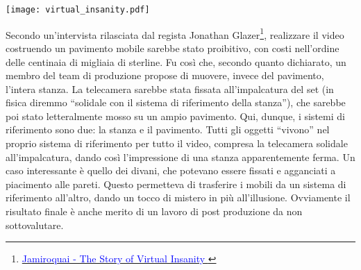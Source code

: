 \begin{marginfigure}
    \centering
    \texttt{[image: virtual\_insanity.pdf]}
    \caption{Schema semplificato del set realizzato per il video musicale:
    (1) telecamera fissata alla stanza mobile, (2) Jay Kay che si diverte,
    (3) stanza mobile, (4) pavimento del set.}
\end{marginfigure}


Secondo un'intervista rilasciata dal regista Jonathan Glazer\footnote{\href{https://www.youtube.com/watch?v=nY6YwZzKzTI}{\textcolor{blue}{Jamiroquai - The Story of Virtual Insanity
}}}, realizzare il video costruendo un pavimento mobile sarebbe
stato proibitivo, con costi nell'ordine delle centinaia di migliaia
di sterline. Fu così che, secondo quanto dichiarato, un membro del team di produzione
propose di muovere, invece del pavimento, l'intera stanza.
La telecamera sarebbe stata fissata all'impalcatura del set
(in fisica diremmo ``solidale con il sistema di riferimento
della stanza''), che sarebbe poi stato letteralmente mosso
su un ampio pavimento.
Qui, dunque, i sistemi di riferimento sono due: la stanza e il
pavimento. Tutti gli oggetti ``vivono'' nel proprio sistema
di riferimento per tutto il video, compresa la telecamera solidale
all'impalcatura, dando così l'impressione di
una stanza apparentemente ferma. Un caso interessante è
quello dei divani, che potevano essere fissati e agganciati
a piacimento alle pareti. Questo permetteva di trasferire
i mobili da un sistema di riferimento all'altro, dando un
tocco di mistero in più all'illusione. Ovviamente il risultato finale
è anche merito di un lavoro di post produzione da non sottovalutare.




